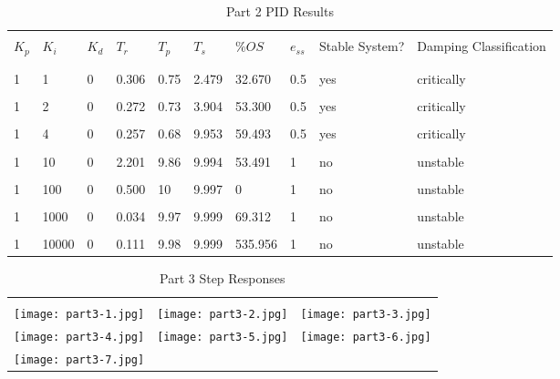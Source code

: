 \begin{table}[H]
	\begin{tabularx}{\textwidth}{XXXXXXXXXX}
		\toprule
		\\ $K_p$ & $K_i$ & $K_d$ & $T_r$ & $T_p$ & $T_s$ & $\%OS$ & $e_{ss}$ 
		& Stable System? & Damping Classification
		\\ \midrule
		
\\\midrule\\1&1&0&0.306&0.75&2.479&32.670&0.5&yes&critically 
\\\midrule\\1&2&0&0.272&0.73&3.904&53.300&0.5&yes&critically 
\\\midrule\\1&4&0&0.257&0.68&9.953&59.493&0.5&yes&critically 
\\\midrule\\1&10&0&2.201&9.86&9.994&53.491&1&no&unstable
\\\midrule\\1&100&0&0.500&10&9.997&0&1&no&unstable
\\\midrule\\1&1000&0&0.034&9.97&9.999&69.312&1&no&unstable
\\\midrule\\1&10000&0&0.111&9.98&9.999&535.956&1&no&unstable
		\\ \bottomrule
	\end{tabularx}
	\caption{Part 2 PID Results}
	\label{tab:pid2SimResults}
\end{table}
\begin{table}[H]
\begin{tabular}{ccc}
\toprule
\\ \texttt{[image: part3-1.jpg]} 
& \texttt{[image: part3-2.jpg]} 
& \texttt{[image: part3-3.jpg]} 
\\ \texttt{[image: part3-4.jpg]} 
& \texttt{[image: part3-5.jpg]} 
& \texttt{[image: part3-6.jpg]} 
\\ \texttt{[image: part3-7.jpg]} 
\\ \bottomrule
\end{tabular}
\caption{Part 3 Step Responses}
  \label{tab:part3Response}
\end{table}
